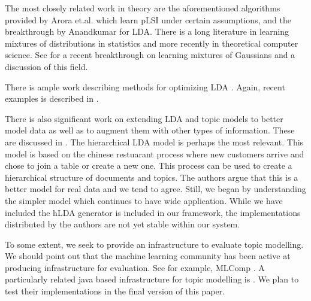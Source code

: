 The most closely related work in theory are the aforementioned
algorithms provided by Arora et.al. \cite{Arora2012} which learn pLSI under
certain assumptions, and the breakthrough by Anandkumar\cite{AnandLDA} for LDA.
There is a long literature in learning mixtures of distributions in
statistics and more recently in theoretical computer science. See
\cite{MoitraValiant} for a recent breakthrough on learning mixtures of
Gaussians and a discussion of this field.

There is ample work describing methods for optimizing
LDA \cite{BleiCACM}.  Again, recent examples is described
in \cite{BleiCBA}.

There is also significant work on extending LDA and topic models to
better model data as well as to augment them with other types of
information.  These are discussed in \cite{BleiCACM}.  The
hierarchical LDA model \cite{BleiCM} is perhaps the most relevant.
This model is based on the chinese restuarant process where new
customers arrive and chose to join a table or create a new one.  This
process can be used to create a hierarchical structure of documents
and topics. The authors argue that this is a better model for real
data and we tend to agree.  Still, we began by understanding the
simpler model which continues to have wide application.  While we have
included the hLDA generator is included in our framework, the
implementations distributed by the authors are not yet stable within
our system.

To some extent, we seek to provide an infrastructure to evaluate topic
modelling. We should point out that the machine learning community has
been active at producing infrastructure for evaluation.  See for
example, MLComp \cite{MLComp}. A particularly related java based
infrastructure for topic modelling is \cite{McCallumMALLET}.  We plan to test their
implementations in the final version of this paper.
